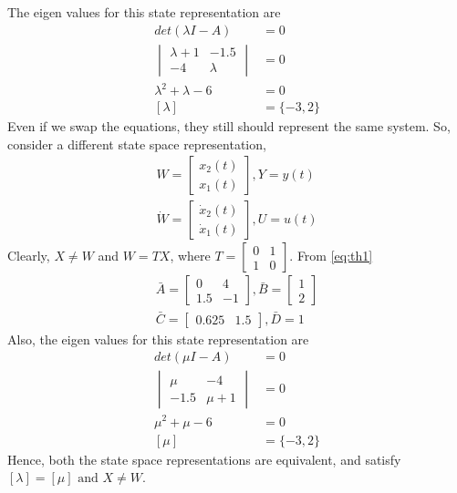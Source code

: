\documentclass[journal,12pt,twocolumn]{IEEEtran}
\begin{document}
The eigen values for this state representation are
\begin{align}
    det(\lambda I-A)&=0\\
    \begin{vmatrix}
    \lambda+1 & -1.5\\
    -4 & \lambda
    \end{vmatrix}&=0\\
    \lambda^2+\lambda-6&=0\\
    [\lambda]&=\{-3,2\}
\end{align}
Even if we swap the equations, they still should represent the same system. So, consider a different state space representation, 
\begin{align}
    W=\begin{bmatrix}
    x_2(t)\\x_1(t)
    \end{bmatrix},Y=y(t)\\
    \dot W=\begin{bmatrix}
    \dot x_2(t)\\\dot x_1(t)
    \end{bmatrix},U=u(t)
\end{align}
Clearly, $X\neq W$ and $W=TX$, where $T=\begin{bmatrix}
0 & 1\\
1 & 0
\end{bmatrix}$. From \eqref{eq:th1}
\begin{align}
    \bar A=\begin{bmatrix}
    0 & 4\\
    1.5 & -1
    \end{bmatrix},\bar B=\begin{bmatrix}
    1\\
    2
    \end{bmatrix}\\
    \bar C=\begin{bmatrix}
    0.625 & 1.5
    \end{bmatrix},\bar D=1
\end{align}
Also, the eigen values for this state representation are
\begin{align}
    det(\mu I-A)&=0\\
    \begin{vmatrix}
    \mu & -4\\
    -1.5 & \mu+1
    \end{vmatrix}&=0\\
    \mu^2+\mu-6&=0\\
    [\mu]&=\{-3,2\}
\end{align}
Hence, both the state space representations are equivalent, and satisfy $[\lambda]=[\mu] \text{ and } X\neq W$.
\end{document}
